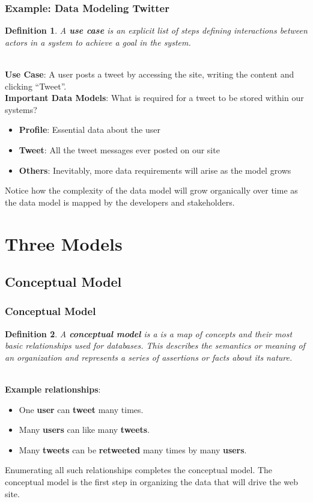 \documentclass[aspectratio=169]{beamer}
\newtheorem{defn}{Definition}
\begin{document}
\begin{frame}
\frametitle{Example: Data Modeling Twitter}
\begin{defn}
A \textbf{use case} is an explicit list of steps defining interactions between actors in a system to achieve a \textit{goal} in the system.
\end{defn}
\pause
\mbox{}\\
\textbf{Use Case}: A user posts a tweet by accessing the site, writing the content and clicking ``Tweet''.
\pause
\mbox{}\\
\textbf{Important Data Models}: What is required for a tweet to be stored within our systems?
\begin{itemize}
	\item \textbf{Profile}: Essential data about the user
	\item \textbf{Tweet}: All the tweet messages ever posted on our site
	\item \textbf{Others}: Inevitably, more data requirements will arise as the model grows
\end{itemize}
Notice how the complexity of the data model will grow organically over time as the data model is mapped by the developers and stakeholders.
\end{frame}

\section{Three Models}
\subsection{Conceptual Model}
\begin{frame}
\frametitle{Conceptual Model}
\begin{defn}
A \textbf{conceptual model} is a is a map of concepts and their most basic relationships used for databases. This describes the semantics or meaning of an organization and represents a series of assertions or facts about its nature.
\end{defn}
\pause
\mbox{}\\
\textbf{Example relationships}:
\begin{itemize}
	\item One \textbf{user} can \textbf{tweet} many times.
	\item Many \textbf{users} can like many \textbf{tweets}.
	\item Many \textbf{tweets} can be \textbf{retweeted} many times by many \textbf{users}.
\end{itemize}
Enumerating all such relationships completes the conceptual model. The conceptual model is the first step in organizing the data that will drive the web site.
\end{frame}
\end{document}
